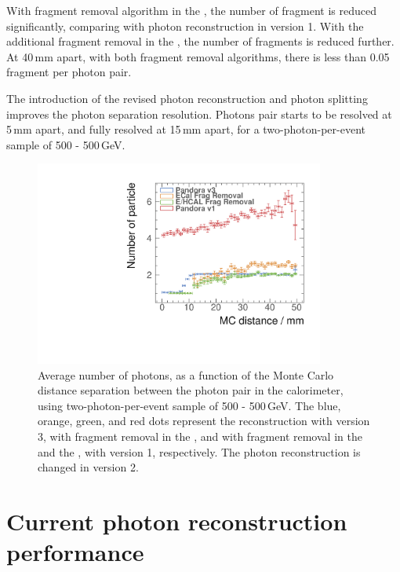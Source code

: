 With fragment removal algorithm in the \ECAL, the number of fragment is reduced significantly, comparing with photon reconstruction in \pandora version 1. With the additional fragment removal in the \HCAL, the number of fragments is reduced further. At 40\,mm apart, with both fragment removal algorithms, there is less than 0.05 fragment per photon pair.

The introduction of the revised photon reconstruction and photon splitting improves the photon separation resolution. Photons pair starts to be resolved at 5\,mm apart, and fully resolved at 15\,mm apart, for a two-photon-per-event sample of 500 - 500\,GeV.



\begin{figure}[tbph]
\centering
\includegraphics[width=0.85\textwidth]{photon/DoubleCompareAlg3.pdf}
\caption[Average number of photons, as a function of the MC distance separation for different algorithms combinations.]
{Average number of photons, as a function of the Monte Carlo distance separation between the photon pair in the calorimeter, using two-photon-per-event sample of 500 - 500\,GeV. The blue, orange, green, and red dots represent the reconstruction with \pandora version 3, with fragment removal in the \ECAL, and with fragment removal in the \ECAL and the \HCAL, with \pandora version 1, respectively. The photon reconstruction is changed in \pandora version 2.}
\label{fig:photonDoubleCompareAlgs}
\end{figure}

\section{Current photon reconstruction performance}

